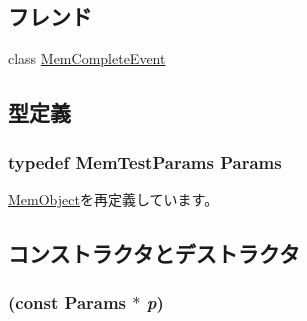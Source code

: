 \subsection*{フレンド}
\begin{DoxyCompactItemize}
\item 
class \hyperlink{classMemTest_a24edf30be1f143e9b680a6b2e3747fbd}{MemCompleteEvent}
\end{DoxyCompactItemize}


\subsection{型定義}
\hypertarget{classMemTest_a9c0e666eb773a0cfe77b832270b05c24}{
\subsubsection[{Params}]{\setlength{\rightskip}{0pt plus 5cm}typedef MemTestParams {\bf Params}}}
\label{classMemTest_a9c0e666eb773a0cfe77b832270b05c24}


\hyperlink{classMemObject_a905bbc621eeec0ed08859e21c8c95412}{MemObject}を再定義しています。

\subsection{コンストラクタとデストラクタ}
\hypertarget{classMemTest_ae10fa702de4fca2792933a1386ca93a1}{
\subsubsection[{MemTest}]{ (const {\bf Params} $\ast$ {\em p})}}
\label{classMemTest_ae10fa702de4fca2792933a1386ca93a1}



